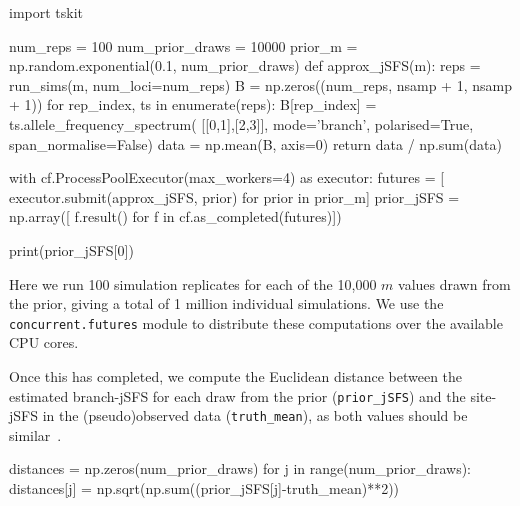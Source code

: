 \documentclass[graybox]{svmult}
\begin{document}
\begin{pythoncode}
import tskit

num_reps = 100
num_prior_draws = 10000
prior_m = np.random.exponential(0.1, num_prior_draws)
def approx_jSFS(m):
    reps = run_sims(m, num_loci=num_reps)
    B = np.zeros((num_reps, nsamp + 1, nsamp + 1))
    for rep_index, ts in enumerate(reps):
        B[rep_index] = ts.allele_frequency_spectrum(
            [[0,1],[2,3]], mode='branch',
            polarised=True, span_normalise=False)
    data = np.mean(B, axis=0)
    return data / np.sum(data)

with cf.ProcessPoolExecutor(max_workers=4) as executor:
    futures = [
        executor.submit(approx_jSFS, prior) for prior in prior_m]
    prior_jSFS = np.array([
        f.result() for f in cf.as_completed(futures)])

print(prior_jSFS[0])
\end{pythoncode}

Here we run 100 simulation replicates for each of the 10,000
$m$ values drawn from the prior, giving a total of 1 million individual simulations.
We use the \texttt{concurrent.futures} module to distribute these
computations over the available CPU cores.

Once this has completed, we compute the Euclidean distance between the estimated branch-jSFS for each
draw from the prior (\texttt{prior\_jSFS}) and the site-jSFS in the (pseudo)observed
data (\texttt{truth\_mean}), as both values should be
similar~\citep{ralph2020efficiently}.
\begin{pythoncode}
distances = np.zeros(num_prior_draws)
for j in range(num_prior_draws):
    distances[j] = np.sqrt(np.sum((prior_jSFS[j]-truth_mean)**2))
\end{pythoncode}
\end{document}
